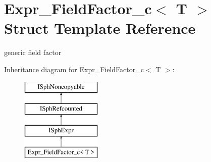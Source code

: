 \hypertarget{structExpr__FieldFactor__c}{\section{Expr\-\_\-\-Field\-Factor\-\_\-c$<$ T $>$ Struct Template Reference}
\label{structExpr__FieldFactor__c}
}


generic field factor  


Inheritance diagram for Expr\-\_\-\-Field\-Factor\-\_\-c$<$ T $>$\-:\begin{figure}[H]
\begin{center}
\leavevmode
\includegraphics[height=4.000000cm]{structExpr__FieldFactor__c}
\end{center}
\end{figure}
